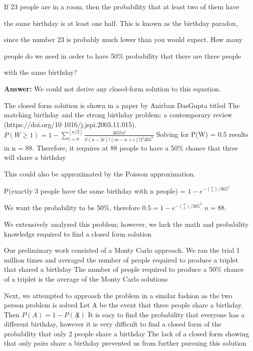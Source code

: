 \documentclass{article}
\author{Group 13: Elliott Pryor, Ben Bushnell, Shengnan Zhou}
\date{due: 18 October 2019}
\begin{document}
\nextprob

If 23 people are in a room, then the probability that at least two of them have

the same birthday is at least one half.  This is known as the birthday paradox,

since the number 23 is probably much lower than you would expect.  How many

people do we need in order to have 50\% probability that there are three people

with the same birthday?






\textbf{Answer: } We could not derive any closed-form solution to this equation. 



The closed form solution is shown in a paper by Anirban DasGupta titled The matching
 birthday and the strong birthday problem: a contemporary review (https://doi.org/10
1016/j.jspi.2003.11.015). $P(W \geq 1) = 1 - \sum_{i=0}^{\left \lfloor{n/2}\right \rfloor } \frac{365!n!}{i!(n-2i)!(m-n+i)!2^i365^n}$
 Solving for P(W) = 0.5 results in n = 88. Therefore, it requires at 88 people to have a 50\% chance that three will share a birthday


This could also be approximated by the Poisson approximation. 

P(exactly 3 people have the same birthday with n people) = $1 - e^{-{n\choose 3}/365^2}$

We want the probability to be 50\%, therefore $0.5 = 1 - e^{-{n\choose 3}/365^2}$
 $n = 88$.



We extensively analyzed this problem; however, we lack the math and probability knowledge required to find a closed form solution


Our preliminary work consisted of a Monty Carlo approach. We ran the trial 1 million times and averaged the number of people required to produce a triplet that shared a birthday
 The number of people required to produce a 50\% chance of a triplet is the average of the Monty Carlo solutions


Next, we attempted to approach the problem in a similar fashion as the two person problem is solved
 Let A be the event that three people share a birthday. Then $P(A) = 1 - P(\not A)$
 It is easy to find the probability that everyone has a different birthday, however it is very difficult to find a closed form of the probability that only 2 people share a birthday
 The lack of a closed form showing that only pairs share a birthday prevented us from further pursuing this solution
\end{document}
